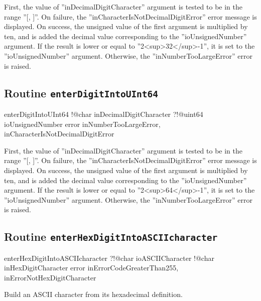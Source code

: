 First, the value of ''inDecimalDigitCharacter'' argument is tested to be in the range ''[\textquotesingle, \textquotesingle]''. On failure, the ''inCharacterIsNotDecimalDigitError'' error message is displayed. On success, the unsigned value of the first argument is multiplied by ten, and is added the decimal value corresponding to the ''ioUnsignedNumber'' argument. If the result is lower or equal to ''2<sup>32</sup>-1'', it is set to the ''ioUnsignedNumber'' argument. Otherwise, the ''inNumberTooLargeError'' error is raised.

\subsection{Routine \texttt{enterDigitIntoUInt64}}

\begin{galgas}
enterDigitIntoUInt64 !@char inDecimalDigitCharacter
                     ?!@uint64 ioUnsignedNumber
                     error inNumberTooLargeError,
                           inCharacterIsNotDecimalDigitError
\end{galgas}

First, the value of ''inDecimalDigitCharacter'' argument is tested to be in the range ''[\textquotesingle, \textquotesingle]''. On failure, the ''inCharacterIsNotDecimalDigitError'' error message is displayed. On success, the unsigned value of the first argument is multiplied by ten, and is added the decimal value corresponding to the ''ioUnsignedNumber'' argument. If the result is lower or equal to ''2<sup>64</sup>-1'', it is set to the ''ioUnsignedNumber'' argument. Otherwise, the ''inNumberTooLargeError'' error is raised.

\subsection{Routine \texttt{enterHexDigitIntoASCIIcharacter}}

\begin{galgas}
enterHexDigitIntoASCIIcharacter ?!@char ioASCIICharacter
                                !@char inHexDigitCharacter
                                error inErrorCodeGreaterThan255,
                                      inErrorNotHexDigitCharacter
\end{galgas}

Build an ASCII character from its hexadecimal definition.

